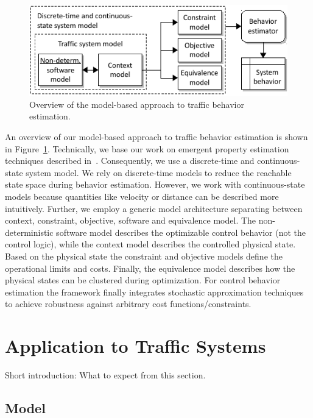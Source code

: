 \documentclass[conference]{../cls/IEEEtran}
\begin{document}
\begin{figure}[b]
	\centering
	\includegraphics{../gfx/framework.pdf}
	\caption{Overview of the model-based approach to traffic behavior estimation.}
	\label{fig:framework}
\end{figure}
An overview of our model-based approach to traffic behavior estimation is shown in Figure~\ref{fig:framework}. Technically, we base our work on emergent property estimation techniques described in~\cite{Hackenberg2012}. Consequently, we use a discrete-time and continuous-state system model. We rely on discrete-time models to reduce the reachable state space during behavior estimation. However, we work with continuous-state models because quantities like velocity or distance can be described more intuitively. Further, we employ a generic model architecture separating between context, constraint, objective, software and equivalence model. The non-deterministic software model describes the optimizable control behavior (not the control logic), while the context model describes the controlled physical state. Based on the physical state the constraint and objective models define the operational limits and costs. Finally, the equivalence model describes how the physical states can be clustered during optimization. For control behavior estimation the framework finally integrates stochastic approximation techniques~\cite{Pereira1991} to achieve robustness against arbitrary cost functions/constraints.

\section{Application to Traffic Systems}

Short introduction: What to expect from this section.

\subsection{Model}
\end{document}
